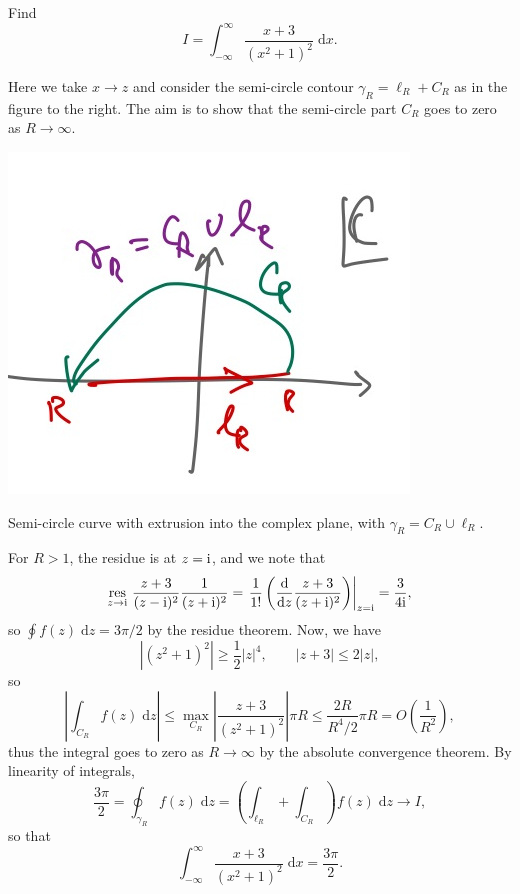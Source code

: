 \documentclass[letter-paper]{tufte-book}
\newenvironment{example}[1][Example]{\begin{trivlist}
\item[\hskip \labelsep {\bfseries #1}]}{\end{trivlist}}
\newcommand{\zi}{{\rm i}}
\begin{document}
\begin{example}
  Find
  \begin{equation*}
    I = \int_{-\infty}^\infty \frac{x+3}{(x^2+1)^2}\; \mathrm{d}x.
  \end{equation*}
  
  Here we take $x\to z$ and consider the semi-circle contour $\gamma_R = \ell_R
  + C_R$ as in the figure to the right. The aim is to show that the semi-circle
  part $C_R$ goes to zero as $R\to \infty$.
  
  \begin{marginfigure}
    \includegraphics{figs/comp_semicircle_curve}
    \caption{Semi-circle curve with extrusion into the complex plane, with
    $\gamma_R = C_R \cup \ell_R$.}
  \end{marginfigure}
  
  
  For $R > 1$, the residue is at $z=\zi$, and we note that
  \begin{equation*}
    \underset{z \to \zi}{\mbox{res}}\ \frac{z+3}{(z-\zi)^2}\frac{1}{(z+\zi)^2} = \left.\frac{1}{1!} \left(\frac{\mathrm{d}}{\mathrm{d}z} \frac{z+3}{(z+\zi)^2}\right)\right|_{z=\zi} = \frac{3}{4\zi},
  \end{equation*}
  so $\oint f(z)\; \mathrm{d}z = 3\pi/2$ by the residue theorem. Now, we have
  \begin{equation*}
    |(z^2+1)^2| \geq \frac{1}{2}|z|^4, \qquad |z+3| \leq 2|z|,
  \end{equation*}
  so
  \begin{equation*}
    \left|\int_{C_R} f(z)\; \mathrm{d}z\right| \leq \max_{C_R} \left|\frac{z+3}{(z^2+1)^2}\right| \pi R \leq \frac{2R}{R^4/2} \pi R = O\left(\frac{1}{R^2}\right),
  \end{equation*}
  thus the integral goes to zero as $R\to\infty$ by the absolute convergence
  theorem. By linearity of integrals, 
  \begin{equation*}
    \frac{3\pi}{2} = \oint_{\gamma_R} f(z)\; \mathrm{d}z = \left(\int_{\ell_R} + \int_{C_R}\right) f(z)\; \mathrm{d}z \to I,
  \end{equation*}
  so that
  \begin{equation*}
    \int_{-\infty}^\infty \frac{x+3}{(x^2+1)^2}\; \mathrm{d}x = \frac{3\pi}{2}.
  \end{equation*}
\end{example}
\end{document}
